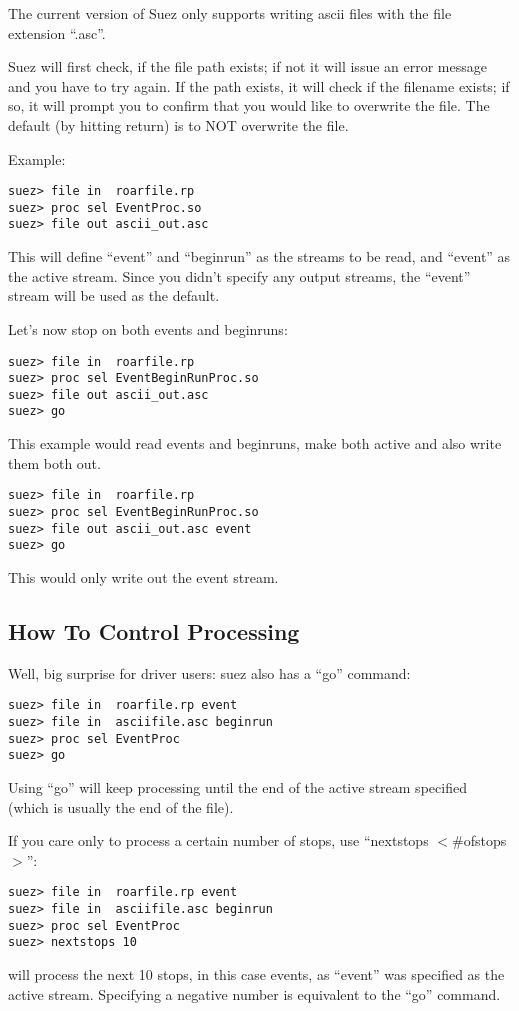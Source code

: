 \documentclass[12pt]{article}
\begin{document}
The current version of Suez only supports writing ascii files with the file extension ``.asc''.

Suez will first check, if the file path exists; if not it will issue an
error message and you have to try again. If the path exists, it will
check if the filename exists; if so, it will prompt you to confirm that
you would like to overwrite the file. The default (by hitting return) is
to NOT overwrite the file.

\noindent Example:
%
\begin{verbatim}
suez> file in  roarfile.rp
suez> proc sel EventProc.so
suez> file out ascii_out.asc
\end{verbatim}
%
This will define ``event'' and ``beginrun'' as the streams to be read,
and ``event'' as the active stream. Since you didn't specify any output
streams, the ``event'' stream will be used as the default.

\noindent Let's now stop on both events and beginruns:
%
\begin{verbatim}
suez> file in  roarfile.rp
suez> proc sel EventBeginRunProc.so
suez> file out ascii_out.asc
suez> go 
\end{verbatim}
%
This example would read events and beginruns, make both active and also
write them both out.
%
\begin{verbatim}
suez> file in  roarfile.rp
suez> proc sel EventBeginRunProc.so
suez> file out ascii_out.asc event
suez> go 
\end{verbatim}
%
This would only write out the event stream.


\subsection{How To Control Processing}
\label{sec:tutorial-processing}

Well, big surprise for driver users: suez also has a ``go'' command:
%
\begin{verbatim}
suez> file in  roarfile.rp event
suez> file in  asciifile.asc beginrun
suez> proc sel EventProc
suez> go 
\end{verbatim}
%
Using ``go'' will keep processing until the end of the active stream
specified (which is usually the end of the file).

If you care only to process a certain number of stops, use ``nextstops
$<$\#ofstops$>$'': 
%
\begin{verbatim}
suez> file in  roarfile.rp event
suez> file in  asciifile.asc beginrun
suez> proc sel EventProc
suez> nextstops 10
\end{verbatim}
%
will process the next 10 stops, in this case events, as ``event'' was
specified as the active stream.
Specifying a negative number is equivalent to the ``go'' command.
\end{document}
